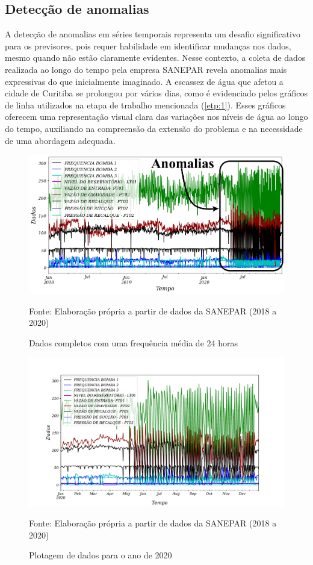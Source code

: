  

\subsection{Detec\c cão de anomalias} \label{subsec:detec}



A detecção de anomalias em séries temporais representa um desafio significativo para os previsores, pois requer habilidade em identificar mudanças nos dados, mesmo quando não estão claramente evidentes. Nesse contexto, a coleta de dados realizada ao longo do tempo pela empresa SANEPAR revela anomalias mais expressivas do que inicialmente imaginado. A escassez de água que afetou a cidade de Curitiba se prolongou por vários dias, como é evidenciado pelos gráficos de linha utilizados na etapa de trabalho mencionada (\ref{etp:1}). Esses gráficos oferecem uma representação visual clara das variações nos níveis de água ao longo do tempo, auxiliando na compreensão da extensão do problema e na necessidade de uma abordagem adequada.

\begin{figure}[htp!]
	\centering
	\caption{Dados completos com uma frequência média de 24 horas}
	\label{fig:dados-todos}
	\includegraphics[width=0.9\linewidth]{"Introducao/Figuras/dados todos"}
	
	Fonte: Elaboração própria a partir de dados da SANEPAR (2018 a 2020)
\end{figure}

\begin{figure}[htp!]
	\centering
	\caption{Plotagem de dados para o ano de 2020}
	\label{fig:2020-a-frente}
	\includegraphics[width=0.9\linewidth]{"Introducao/Figuras/2020 a frente"}
	
	Fonte: Elaboração própria a partir de dados da SANEPAR (2018 a 2020)
\end{figure}



